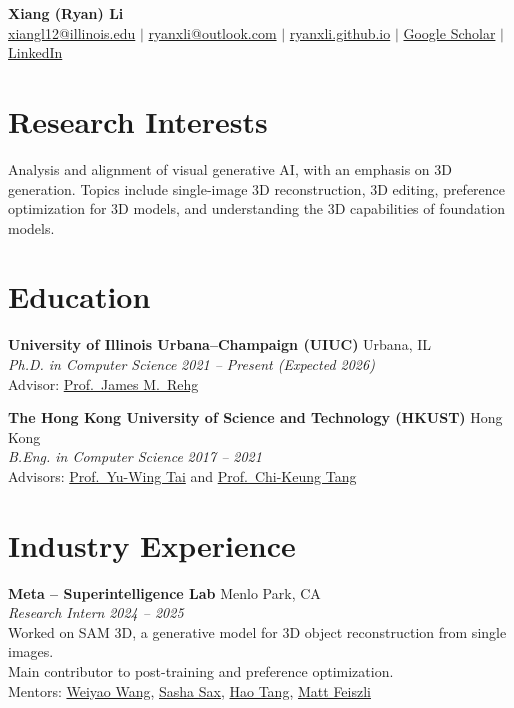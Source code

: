 \documentclass[11pt,letterpaper]{article}
\newcommand{\cventry}[4]{
    \noindent\textbf{#1} \hfill #2 \\
    \textit{#3} \hfill \textit{#4}
}
\begin{document}
\begin{center}
    {\LARGE\bfseries Xiang (Ryan) Li} \\[4pt]
    \href{mailto:xiangl12@illinois.edu}{xiangl12@illinois.edu} \quad $\vert$ \quad
    \href{mailto:ryanxli@outlook.com}{ryanxli@outlook.com} \quad $\vert$ \quad
    \href{https://ryanxli.github.io}{ryanxli.github.io} \quad $\vert$ \quad
    \href{https://scholar.google.com/citations?user=3Ds7hOQAAAAJ}{Google Scholar} \quad $\vert$ \quad
    \href{https://www.linkedin.com/in/xiang-li-52aa4912a}{LinkedIn}
\end{center}

\section{Research Interests}

Analysis and alignment of visual generative AI, with an emphasis on 3D generation.
Topics include single-image 3D reconstruction, 3D editing, preference optimization for 3D models, and understanding the 3D capabilities of foundation models.

\section{Education}

\cventry{University of Illinois Urbana--Champaign (UIUC)}{Urbana, IL}{Ph.D. in Computer Science}{2021 -- Present (Expected 2026)} \\
Advisor: \href{https://rehg.org/}{Prof.\ James M.\ Rehg}

\vspace{8pt}

\cventry{The Hong Kong University of Science and Technology (HKUST)}{Hong Kong}{B.Eng. in Computer Science}{2017 -- 2021} \\
Advisors: \href{https://yuwingtai.github.io/}{Prof.\ Yu-Wing Tai} and \href{https://scholar.google.com/citations?user=EWfpM74AAAAJ}{Prof.\ Chi-Keung Tang}

\section{Industry Experience}

\cventry{Meta -- Superintelligence Lab}{Menlo Park, CA}{Research Intern}{2024 -- 2025} \\
Worked on SAM 3D, a generative model for 3D object reconstruction from single images. \\
Main contributor to post-training and preference optimization. \\
Mentors: \href{https://sites.google.com/view/weiyaowang/home}{Weiyao Wang}, \href{https://alexsax.github.io/}{Sasha Sax}, \href{https://scholar.google.com/citations?user=XY6Nh9YAAAAJ&hl=en}{Hao Tang}, \href{https://scholar.google.com/citations?user=A-wA73gAAAAJ&hl=en}{Matt Feiszli}
\end{document}
